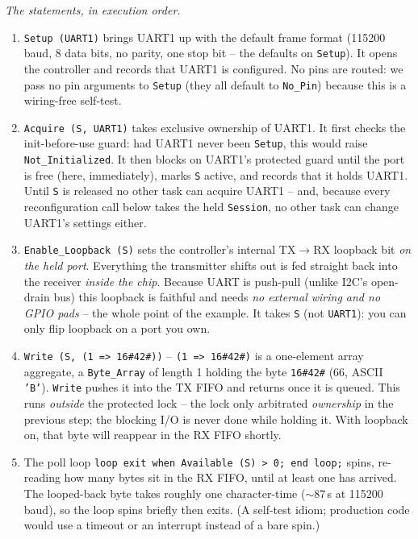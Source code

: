 \emph{The statements, in execution order.}
\begin{enumerate}
\item \texttt{Setup (UART1)} brings UART1 up with the default frame format
  (115200 baud, 8 data bits, no parity, one stop bit -- the defaults on
  \texttt{Setup}). It opens the controller and records that UART1 is configured.
  No pins are routed: we pass no pin arguments to \texttt{Setup} (they all
  default to \texttt{No\_Pin}) because this is a wiring-free self-test.
\item \texttt{Acquire (S, UART1)} takes exclusive ownership of UART1. It first
  checks the init-before-use guard: had UART1 never been \texttt{Setup}, this
  would raise \texttt{Not\_Initialized}. It then blocks on UART1's protected
  guard until the port is free (here, immediately), marks \texttt{S} active, and
  records that it holds UART1. Until \texttt{S} is released no other task can
  acquire UART1 -- and, because every reconfiguration call below takes the held
  \texttt{Session}, no other task can change UART1's settings either.
\item \texttt{Enable\_Loopback (S)} sets the controller's internal TX$\rightarrow$RX
  loopback bit \emph{on the held port}. Everything the transmitter shifts out is
  fed straight back into the receiver \emph{inside the chip}. Because UART is
  push-pull (unlike I2C's open-drain bus) this loopback is faithful and needs
  \emph{no external wiring and no GPIO pads} -- the whole point of the example.
  It takes \texttt{S} (not \texttt{UART1}): you can only flip loopback on a port
  you own.
\item \texttt{Write (S, (1 => 16\#42\#))} -- \texttt{(1 => 16\#42\#)} is a
  one-element array aggregate, a \texttt{Byte\_Array} of length 1 holding the
  byte \texttt{16\#42\#} (66, ASCII \texttt{'B'}). \texttt{Write} pushes it into
  the TX FIFO and returns once it is queued. This runs \emph{outside} the
  protected lock -- the lock only arbitrated \emph{ownership} in the previous
  step; the blocking I/O is never done while holding it. With loopback on, that
  byte will reappear in the RX FIFO shortly.
\item The poll loop \texttt{loop exit when Available (S) > 0; end loop;} spins,
  re-reading how many bytes sit in the RX FIFO, until at least one has arrived.
  The looped-back byte takes roughly one character-time ($\sim$87\,\textmu s at
  115200 baud), so the loop spins briefly then exits. (A self-test idiom;
  production code would use a timeout or an interrupt instead of a bare spin.)

\end{enumerate}
